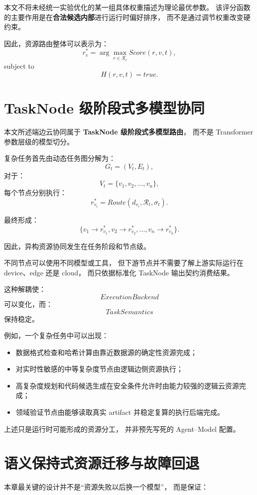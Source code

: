 \documentclass[UTF8,a4paper,12pt,oneside]{ctexbook}
\begin{document}
本文不将未经统一实验优化的某一组具体权重描述为理论最优参数。
该评分函数的主要作用是在\textbf{合法候选内部}进行运行时偏好排序，
而不是通过调节权重改变硬约束。

因此，资源路由整体可以表示为：
\[
r_v^{*}
=
\arg\max_{r\in\mathcal{R}_t}
Score(r,v,t),
\]
subject to
\[
H(r,v,t)=true.
\]


\section{TaskNode 级阶段式多模型协同}

本文所述端边云协同属于
\textbf{TaskNode 级阶段式多模型路由}，
而不是 Transformer 参数层级的模型切分。

复杂任务首先由动态任务图分解为：
\[
G_t=(V_t,E_t),
\]
对于：
\[
V_t=
\{v_1,v_2,\ldots,v_n\},
\]
每个节点分别执行：
\[
r_{v_i}^{*}
=
Route(d_{v_i},\mathcal{R}_t,\sigma_t).
\]

最终形成：
\[
\{
v_1\rightarrow r_{v_1}^{*},
v_2\rightarrow r_{v_2}^{*},
\ldots,
v_n\rightarrow r_{v_n}^{*}
\}.
\]

因此，异构资源协同发生在任务阶段和节点级。

不同节点可以使用不同模型或工具，
但下游节点并不需要了解上游实际运行在 device、edge 还是 cloud，
而只依据标准化 TaskNode 输出契约消费结果。

这种解耦使：
\[
ExecutionBackend
\]
可以变化，而：
\[
TaskSemantics
\]
保持稳定。

例如，一个复杂任务中可以出现：

\begin{itemize}
    \item 数据格式检查和哈希计算由靠近数据源的确定性资源完成；
    \item 对实时性敏感的中等复杂度节点由逻辑边侧资源执行；
    \item 高复杂度规划和代码候选生成在安全条件允许时由能力较强的逻辑云资源完成；
    \item 领域验证节点由能够读取真实 artifact 并稳定复算的执行后端完成。
\end{itemize}

上述只是运行时可能形成的资源分工，
并非预先写死的 Agent--Model 配置。


\section{语义保持式资源迁移与故障回退}

本章最关键的设计并不是“资源失败以后换一个模型”，
而是保证：
\end{document}
